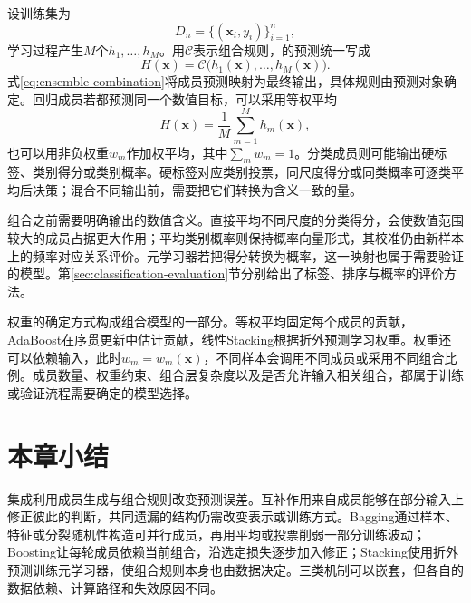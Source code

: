 设训练集为
\[
  D_n=\{(\bm{x}_i,y_i)\}_{i=1}^{n},
\]
学习过程产生$M$个$h_1,\ldots,h_M$。用$\mathcal{C}$表示组合规则，的预测统一写成
\begin{equation}
  H(\bm{x})
  =\mathcal{C}\bigl(h_1(\bm{x}),\ldots,h_M(\bm{x})\bigr).
  \label{eq:ensemble-combination}
\end{equation}
式\eqref{eq:ensemble-combination}将成员预测映射为最终输出，具体规则由预测对象确定。回归成员若都预测同一个数值目标，可以采用等权平均
\[
  H(\bm{x})=\frac{1}{M}\sum_{m=1}^{M}h_m(\bm{x}),
\]
也可以用非负权重$w_m$作加权平均，其中$\sum_m w_m=1$。分类成员则可能输出硬标签、类别得分或类别概率。硬标签对应类别投票，同尺度得分或同类概率可逐类平均后决策；混合不同输出前，需要把它们转换为含义一致的量。

组合之前需要明确输出的数值含义。直接平均不同尺度的分类得分，会使数值范围较大的成员占据更大作用；平均类别概率则保持概率向量形式，其校准仍由新样本上的频率对应关系评价。元学习器若把得分转换为概率，这一映射也属于需要验证的模型。第\ref{sec:classification-evaluation}节分别给出了标签、排序与概率的评价方法。

权重的确定方式构成组合模型的一部分。等权平均固定每个成员的贡献，AdaBoost在序贯更新中估计贡献，线性Stacking根据折外预测学习权重。权重还可以依赖输入，此时$w_m=w_m(\bm{x})$，不同样本会调用不同成员或采用不同组合比例。成员数量、权重约束、组合层复杂度以及是否允许输入相关组合，都属于训练或验证流程需要确定的模型选择。








\section{本章小结}
\label{sec:ensemble-summary}

集成利用成员生成与组合规则改变预测误差。互补作用来自成员能够在部分输入上修正彼此的判断，共同遗漏的结构仍需改变表示或训练方式。Bagging通过样本、特征或分裂随机性构造可并行成员，再用平均或投票削弱一部分训练波动；Boosting让每轮成员依赖当前组合，沿选定损失逐步加入修正；Stacking使用折外预测训练元学习器，使组合规则本身也由数据决定。三类机制可以嵌套，但各自的数据依赖、计算路径和失效原因不同。

